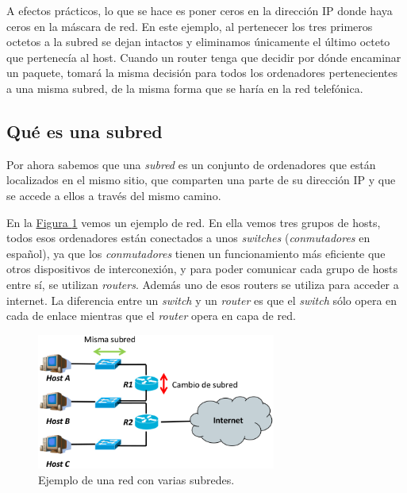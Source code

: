 \documentclass[10pt,a4paper,spanish]{report}
\begin{document}
A efectos prácticos, lo que se hace es poner ceros en la dirección IP donde haya ceros en la máscara de red. En este ejemplo, al pertenecer los tres primeros octetos a la subred se dejan intactos y eliminamos únicamente el último octeto que pertenecía al host. Cuando un router tenga que decidir por dónde encaminar un paquete, tomará la misma decisión para todos los ordenadores pertenecientes a una misma subred, de la misma forma que se haría en la red telefónica.

\subsection{\textcolor{tema4}Qué es una subred}
Por ahora sabemos que una \textit{\textcolor{tema4}{subred}} es un conjunto de ordenadores que están localizados en el mismo sitio, que comparten una parte de su dirección IP y que se accede a ellos a través del mismo camino. 

En la \hyperref[ejemplo_subred1]{Figura \ref*{ejemplo_subred1}} vemos un ejemplo de red. En ella vemos tres grupos de hosts, todos esos ordenadores están conectados a unos \textit{\textcolor{tema4}{switches}} (\textit{\textcolor{tema4}{conmutadores}} en español), ya que los \textit{\textcolor{tema4}{conmutadores}} tienen un funcionamiento más eficiente que otros dispositivos de interconexión, y para poder comunicar cada grupo de hosts entre sí, se utilizan \textit{\textcolor{tema4}{routers}}. Además uno de esos routers se utiliza para acceder a internet. La diferencia entre un \textit{\textcolor{tema4}{switch}} y un \textit{\textcolor{tema4}{router}} es que el \textit{\textcolor{tema4}{switch}} sólo opera en cada de enlace mientras que el \textcolor{tema4}{\textit{router}} opera en capa de red.

\begin{figure}[!h]
  \centering
  \includegraphics[width=0.7\textwidth]{concepto_subred}
  \caption{Ejemplo de una red con varias subredes.}
  \label{ejemplo_subred1}
\end{figure}
\end{document}
